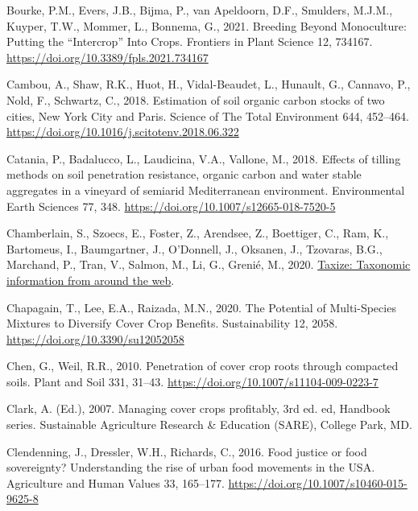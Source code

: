 \documentclass[
  12pt,
]{article}
\newlength{\cslhangindent}
\newlength{\cslentryspacingunit} %
\newenvironment{CSLReferences}[2] %
 {%
  \setlength{\parindent}{0pt}
  \ifodd #1
  \let\oldpar\par
  \def\par{\hangindent=\cslhangindent\oldpar}
  \fi
  \setlength{\parskip}{#2\cslentryspacingunit}
 }%
 {}
\begin{document}
\begin{CSLReferences}{1}{0}
\leavevmode{}%
Bourke, P.M., Evers, J.B., Bijma, P., van Apeldoorn, D.F., Smulders, M.J.M., Kuyper, T.W., Mommer, L., Bonnema, G., 2021. Breeding {Beyond Monoculture}: {Putting} the {``{Intercrop}''} {Into Crops}. Frontiers in Plant Science 12, 734167. \url{https://doi.org/10.3389/fpls.2021.734167}

\leavevmode{}%
Cambou, A., Shaw, R.K., Huot, H., Vidal-Beaudet, L., Hunault, G., Cannavo, P., Nold, F., Schwartz, C., 2018. Estimation of soil organic carbon stocks of two cities, {New York City} and {Paris}. Science of The Total Environment 644, 452--464. \url{https://doi.org/10.1016/j.scitotenv.2018.06.322}

\leavevmode{}%
Catania, P., Badalucco, L., Laudicina, V.A., Vallone, M., 2018. Effects of tilling methods on soil penetration resistance, organic carbon and water stable aggregates in a vineyard of semiarid {Mediterranean} environment. Environmental Earth Sciences 77, 348. \url{https://doi.org/10.1007/s12665-018-7520-5}

\leavevmode{}%
Chamberlain, S., Szoecs, E., Foster, Z., Arendsee, Z., Boettiger, C., Ram, K., Bartomeus, I., Baumgartner, J., O'Donnell, J., Oksanen, J., Tzovaras, B.G., Marchand, P., Tran, V., Salmon, M., Li, G., Grenié, M., 2020. \href{https://github.com/ropensci/taxize}{Taxize: Taxonomic information from around the web}.

\leavevmode{}%
Chapagain, T., Lee, E.A., Raizada, M.N., 2020. The {Potential} of {Multi-Species Mixtures} to {Diversify Cover Crop Benefits}. Sustainability 12, 2058. \url{https://doi.org/10.3390/su12052058}

\leavevmode{}%
Chen, G., Weil, R.R., 2010. Penetration of cover crop roots through compacted soils. Plant and Soil 331, 31--43. \url{https://doi.org/10.1007/s11104-009-0223-7}

\leavevmode{}%
Clark, A. (Ed.), 2007. Managing cover crops profitably, 3rd ed. ed, Handbook series. {Sustainable Agriculture Research \& Education (SARE)}, {College Park, MD}.

\leavevmode{}%
Clendenning, J., Dressler, W.H., Richards, C., 2016. Food justice or food sovereignty? {Understanding} the rise of urban food movements in the {USA}. Agriculture and Human Values 33, 165--177. \url{https://doi.org/10.1007/s10460-015-9625-8}


\end{CSLReferences}
\end{document}
